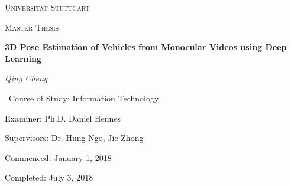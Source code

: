 \begin{titlepage}
	\centering
	{\scshape\LARGE Universität Stuttgart \par}
	\vspace{1cm}
	{\scshape\Large Master Thesis\par}
	\vspace{1.5cm}
	{\Large\bfseries 3D Pose Estimation of Vehicles from Monocular Videos using Deep Learning\par}
	\vspace{2cm}
	{\Large\itshape Qing Cheng\par}
	\vfill
	\
	Course of Study: Information Technology\par
	Examiner:         Ph.D. Daniel Hennes\par
	Supervisors:	Dr. Hung Ngo, Jie Zhong\par
	
	
	Commenced:    January 1, 2018\par
	Completed:        July 3, 2018\par
	
	\vfill
	
	{\large \par}
\end{titlepage}
